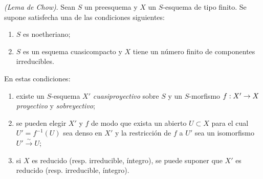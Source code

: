 \documentclass[oneside,10pt]{amsart}
\makeatletter
\newcommand{\ega@arrow}[2]{\mathchoice{#1}{#2}{#2}{#2}}
\renewcommand{\to}{\ega@arrow{\longrightarrow}{\rightarrow}}
\let\EGAOriginalLabel\label
\renewcommand{\label}[1]{\phantomsection\EGAOriginalLabel{#1}}
\makeatother
\begin{document}
\begin{theorem}[5.6.1]
\label{II.5.6.1-fr}
\emph{(Lema de Chow)}.
Sean $S$ un preesquema y $X$ un $S$-esquema de tipo finito.
Se supone satisfecha una de las condiciones siguientes:
\begin{enumerate}
  \item[{\rm(a)}] $S$ es noetheriano;
  \item[{\rm(b)}] $S$ es un esquema cuasicompacto y $X$ tiene un número finito de componentes irreducibles.
\end{enumerate}
En estas condiciones:
\begin{enumerate}
  \item[{\rm(i)}] existe un $S$-esquema $X'$ \emph{cuasiproyectivo} sobre $S$ y un $S$-morfismo $f:X'\to X$ \emph{proyectivo} y \emph{sobreyectivo};
  \item[{\rm(ii)}] se pueden elegir $X'$ y $f$ de modo que exista un abierto $U\subset X$ para el cual $U'=f^{-1}(U)$ sea denso en $X'$ y la restricción de $f$ a $U'$ sea un isomorfismo $U'\xrightarrow{\sim}U$;
  \item[{\rm(iii)}] si $X$ es reducido \textup{(resp.} irreducible, íntegro), se puede suponer que $X'$ es reducido \textup{(resp.} irreducible, íntegro).
\end{enumerate}
\end{theorem}
\end{document}

